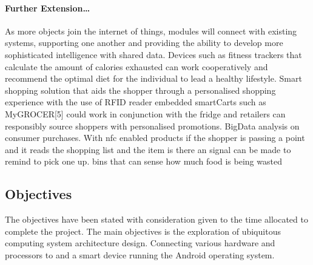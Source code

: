 \documentclass[a4paper, 11pt]{article}
\begin{document}
\paragraph{Further Extension\dots} As more objects join the internet of things, modules will connect with existing systems, supporting one another and providing the ability to develop more sophisticated intelligence with shared data. Devices such as fitness trackers that calculate the amount of calories exhausted can work cooperatively and recommend the optimal diet for the individual to lead a healthy lifestyle. Smart shopping solution that aids the shopper through a personalised shopping experience with the use of RFID reader embedded smartCarts such as MyGROCER[5] could work in conjunction with the fridge and retailers can responsibly source shoppers with personalised promotions. BigData analysis on consumer purchases. With nfc enabled products if the shopper is passing a point and it reads the shopping list and the item is there an signal can be made to remind to pick one up. bins that can sense how much food is being wasted


\subsection{Objectives}

The objectives have been stated with consideration given to the time allocated to complete the project. The main objectives is the exploration of ubiquitous computing system architecture design. Connecting various hardware and processors to and a smart device running the Android operating system. 
\end{document}
